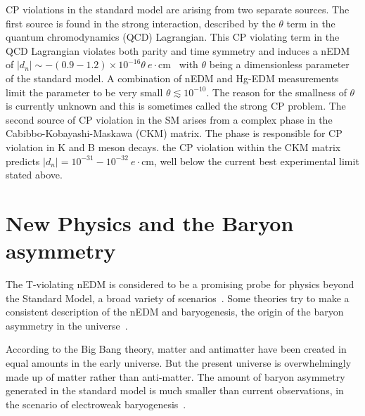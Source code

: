 CP violations in the standard model are arising from two separate
sources.  The first source is found in the strong interaction,
described by the $\theta$ term in the quantum chromodynamics (QCD)
Lagrangian.  This CP violating term in the QCD Lagrangian violates
both parity and time symmetry and induces a nEDM of
$|d_n|\sim-(0.9-1.2)\times
10^{−16}\theta~e\cdot$cm~\cite{bib:chuppetal} with $\theta$ being a
dimensionless parameter of the standard model.  A combination of nEDM
and Hg-EDM measurements limit the parameter to be very small
$\theta\lesssim 10^{-10}$.  The reason for the smallness of $\theta$
is currently unknown and this is sometimes called the strong CP
problem.  The second source of CP violation in the SM arises from a
complex phase in the Cabibbo-Kobayashi-Maskawa (CKM)
matrix\cite{PhysRevLett.10.531}.  The phase is responsible for CP
violation in K and B meson decays.  the CP violation within the CKM
matrix predicts $|d_n| = 10^{-31} - 10^{-32}~e\cdot$cm, well below the
current best experimental limit stated above.


\section{New Physics and the Baryon asymmetry}

The T-violating nEDM is considered to be a promising probe for physics
beyond the Standard Model, a broad variety of
scenarios~\cite{bib:pospelov}.  Some theories try to make a consistent
description of the nEDM and baryogenesis, the origin of the baryon
asymmetry in the universe~\cite{bib:chuppetal}.

According to the Big Bang theory, matter and antimatter have been
created in equal amounts in the early universe. But the present
universe is overwhelmingly made up of matter rather than
anti-matter.
The amount of baryon asymmetry generated in the standard model is much
smaller than current observations, in the scenario of electroweak
baryogenesis~\cite{bib:morrissey}.

